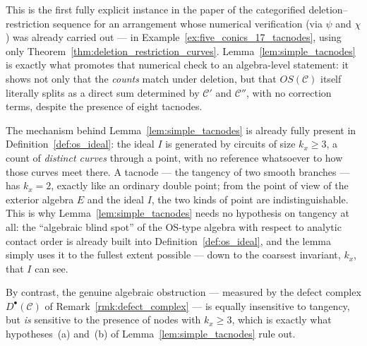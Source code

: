 \documentclass[article,11pt]{amsart} \numberwithin{equation}{section}
\numberwithin{equation}{section}
\begin{document}
{\begin{rk}
	This is the first fully explicit instance in the paper of the categorified
	deletion--restriction sequence for an arrangement whose numerical
	verification (via $\psi$ and $\chi$) was already carried out --- in
	Example~\ref{ex:five_conics_17_tacnodes}, using only Theorem~\ref{thm:deletion_restriction_curves}. Lemma~\ref{lem:simple_tacnodes} is exactly
	what promotes that numerical check to an algebra-level statement: it shows
	not only that the \emph{counts} match under deletion, but that
	$OS(\mathcal C)$ itself literally splits as a direct sum determined by
	$\mathcal C'$ and $\mathcal C''$, with no correction terms, despite the
	presence of eight tacnodes.
\end{rk}

\begin{rk}
	\label{rem:8.14-rewritten}
	The mechanism behind Lemma~\ref{lem:simple_tacnodes} is already fully present in
	Definition~\ref{def:os_ideal}: the ideal $I$ is generated by circuits of size $k_x\ge3$, a
	count of \emph{distinct curves} through a point, with no reference whatsoever
	to how those curves meet there. A tacnode --- the tangency of two smooth
	branches --- has $k_x=2$, exactly like an ordinary double point; from the
	point of view of the exterior algebra $E$ and the ideal $I$, the two kinds of
	point are indistinguishable. This is why Lemma~\ref{lem:simple_tacnodes} needs no
	hypothesis on tangency at all: the ``algebraic blind spot'' of the OS-type
	algebra with respect to analytic contact order is already built into
	Definition~\ref{def:os_ideal}, and the lemma simply uses it to the fullest extent
	possible --- down to the coarsest invariant, $k_x$, that $I$ can see.
	
	By contrast, the genuine algebraic obstruction --- measured by the defect
	complex $D^\bullet(\mathcal C)$ of Remark~\ref{rmk:defect_complex} --- is equally insensitive to
	tangency, but \emph{is} sensitive to the presence of nodes with $k_x\ge3$,
	which is exactly what hypotheses~(a) and~(b) of
	Lemma~\ref{lem:simple_tacnodes} rule out.
\end{rk}

}
\end{document}

